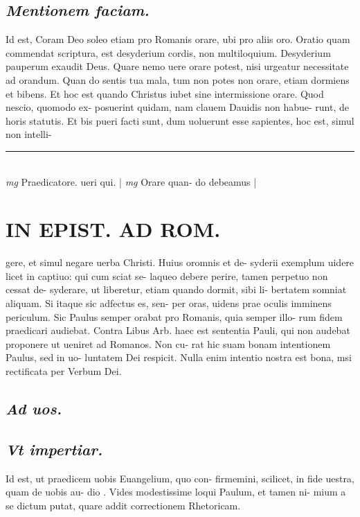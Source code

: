 \documentclass{article}
\begin{document}
\begin{pages}
\subsection*{\textit{Mentionem faciam. }}\pstart Id est, Coram Deo soleo etiam pro Romanis orare, ubi pro aliis oro. Oratio quam commendat scriptura, est desyderium cordis, non multiloquium. Desyderium pauperum exaudit Deus. Quare nemo uere orare potest, nisi urgeatur necessitate ad orandum. Quan do sentis tua mala, tum non potes non orare, etiam dormiens et bibens. Et hoc est quando Christus iubet sine intermissione orare. Quod nescio, quomodo ex- posuerint quidam, nam clauem Dauidis non habue- runt, de horis statutis. Et bis pueri facti sunt, dum uoluerunt esse sapientes, hoc est, simul non intelli-  \pend
\vspace{0.5cm}\noindent
\vspace{0.2cm}\rule{1cm}{0.2pt}\\ 
\hspace{0.2cm}\textit{mg}
\footnotesize Praedicatore. ueri qui. 
\normalsize| 
\hspace{0.2cm}\textit{mg}
\footnotesize Orare quan- do debeamus 
\normalsize| 
\section*{IN EPIST. AD ROM.  }
\marginpar{[ p.9 ]}\pstart gere, et simul negare uerba Christi. Huius oromnis et de- syderii exemplum uidere licet in captiuo: qui cum sciat se- laqueo debere perire, tamen perpetuo non cessat de- syderare, ut liberetur, etiam quando dormit, sibi li- bertatem somniat aliquam. Si itaque sic adfectus es, sen- per oras, uidens prae oculis imminens periculum. Sic Paulus semper orabat pro Romanis, quia semper illo- rum fidem praedicari audiebat.   \pend\pstart Contra Libus Arb. haec est sententia Pauli, qui non audebat proponere ut ueniret ad Romanos. Non cu- rat hic suam bonam intentionem Paulus, sed in uo- luntatem Dei respicit. Nulla enim intentio nostra est bona, msi rectificata per Verbum Dei.   \pend
{}
{}
\subsection*{\textit{Ad uos. }}
{}
\subsection*{\textit{Vt impertiar. }}\pstart Id est, ut praedicem uobis Euangelium, quo con- firmemini, scilicet, in fide uestra, quam de uobis au- dio . Vides modestissime loqui Paulum, et tamen ni- mium a se dictum putat, quare addit correctionem Rhetoricam.  \pend
{}
{}

\end{pages}
\end{document}
